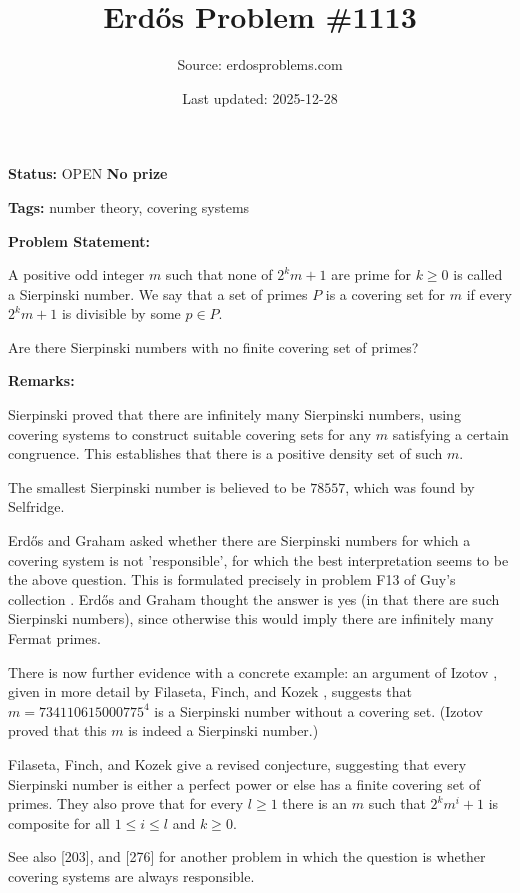 \documentclass{article}
\title{Erd\H{o}s Problem \#1113}
\date{Last updated: 2025-12-28}
\author{Source: erdosproblems.com}
\begin{document}
\maketitle

\noindent\textbf{Status:} OPEN \quad \textbf{No prize}

\noindent\textbf{Tags:} number theory, covering systems

\medskip
\noindent\textbf{Problem Statement:}

A positive odd integer $m$ such that none of $2^km+1$ are prime for $k\geq 0$ is called a Sierpinski number. We say that a set of primes $P$ is a covering set for $m$ if every $2^km+1$ is divisible by some $p\in P$.

Are there Sierpinski numbers with no finite covering set of primes?

\bigskip
\noindent\textbf{Remarks:}

Sierpinski \cite{Si60} proved that there are infinitely many Sierpinski numbers, using covering systems to construct suitable covering sets for any $m$ satisfying a certain congruence. This establishes that there is a positive density set of such $m$.

The smallest Sierpinski number is believed to be $78557$, which was found by Selfridge.

Erd\H{o}s and Graham \cite{ErGr80} asked whether there are Sierpinski numbers for which a covering system is not 'responsible', for which the best interpretation seems to be the above question. This is formulated precisely in problem F13 of Guy's collection \cite{Gu04}. Erd\H{o}s and Graham thought the answer is yes (in that there are such Sierpinski numbers), since otherwise this would imply there are infinitely many Fermat primes.

There is now further evidence with a concrete example: an argument of Izotov \cite{Iz95}, given in more detail by Filaseta, Finch, and Kozek \cite{FFK08}, suggests that $m=734110615000775^4$ is a Sierpinski number without a covering set. (Izotov proved that this $m$ is indeed a Sierpinski number.)

Filaseta, Finch, and Kozek \cite{FFK08} give a revised conjecture, suggesting that every Sierpinski number is either a perfect power or else has a finite covering set of primes. They also prove that for every $l\geq 1$ there is an $m$ such that $2^km^i+1$ is composite for all $1\leq i\leq l$ and $k\geq 0$.

See also [203], and [276] for another problem in which the question is whether covering systems are always responsible.
\end{document}
